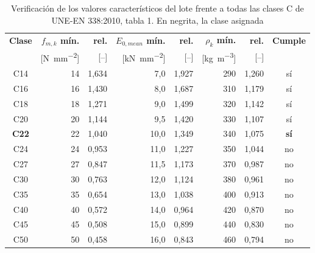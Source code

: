 \documentclass[11pt,a4paper]{article}
\begin{document}
\begin{table}[H]
\centering
\caption[Verificación de los valores característicos del lote frente a todas las clases C de UNE-EN 338:2010, tabla 1]{Verificación de los valores característicos del lote frente a todas las clases C de UNE-EN 338:2010, tabla 1. En negrita, la clase asignada}
\begin{tabular}{c r r r r r r c}
\toprule
\textbf{Clase} & \textbf{$f_{m,k}$ mín.} & \textbf{rel.} & \textbf{$E_{0,mean}$ mín.} & \textbf{rel.} & \textbf{$\rho_{k}$ mín.} & \textbf{rel.} & \textbf{Cumple} \\
 & [\si{\newton\per\square\milli\meter}] & [--] & [\si{\kilo\newton\per\square\milli\meter}] & [--] & [\si{\kilo\gram\per\cubic\meter}] & [--] & \\
\midrule
C14 & 14 & 1,634 & 7,0 & 1,927 & 290 & 1,260 & sí \\
C16 & 16 & 1,430 & 8,0 & 1,687 & 310 & 1,179 & sí \\
C18 & 18 & 1,271 & 9,0 & 1,499 & 320 & 1,142 & sí \\
C20 & 20 & 1,144 & 9,5 & 1,420 & 330 & 1,107 & sí \\
\textbf{C22} & 22 & 1,040 & 10,0 & 1,349 & 340 & 1,075 & \textbf{sí} \\
C24 & 24 & 0,953 & 11,0 & 1,227 & 350 & 1,044 & no \\
C27 & 27 & 0,847 & 11,5 & 1,173 & 370 & 0,987 & no \\
C30 & 30 & 0,763 & 12,0 & 1,124 & 380 & 0,961 & no \\
C35 & 35 & 0,654 & 13,0 & 1,038 & 400 & 0,913 & no \\
C40 & 40 & 0,572 & 14,0 & 0,964 & 420 & 0,870 & no \\
C45 & 45 & 0,508 & 15,0 & 0,899 & 440 & 0,830 & no \\
C50 & 50 & 0,458 & 16,0 & 0,843 & 460 & 0,794 & no \\
\bottomrule
\end{tabular}
\end{table}
\end{document}
